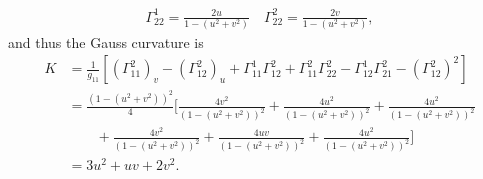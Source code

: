 \documentclass[a4paper,12pt]{article}
\theoremstyle{remark}
\begin{document}
\begin{enumerate}
\begin{enumerate}
\begin{gather*}
                    \Gamma_{22}^1 = \frac{2u}{1 - (u^2 + v^2)} \quad
                    \Gamma_{22}^2 = \frac{2v}{1 - (u^2 + v^2)},
                \end{gather*}
                and thus the Gauss curvature is
                \begin{align*}
                    K &= \frac{1}{g_{11}} \left[ (\Gamma_{11}^2)_v - (\Gamma_{12}^2)_u + \Gamma_{11}^1 \Gamma_{12}^2 + \Gamma_{11}^2 \Gamma_{22}^2 - \Gamma_{12}^1 \Gamma_{21}^2 - (\Gamma_{12}^2)^2 \right] \\
                    &= \frac{(1 - (u^2 + v^2))^2}{4} \biggl[ \frac{4v^2}{(1 - (u^2 + v^2))^2} + \frac{4u^2}{(1 - (u^2 + v^2))^2} + \frac{4u^2}{(1 - (u^2 + v^2))^2} \\
                    &\qquad+ \frac{4v^2}{(1 - (u^2 + v^2))^2} + \frac{4uv}{(1 - (u^2 + v^2))^2} + \frac{4u^2}{(1 - (u^2 + v^2))^2} \biggr] \\
                    &= 3u^2 + uv + 2v^2.
                \end{align*}


\end{enumerate}
\end{enumerate}
\end{document}
